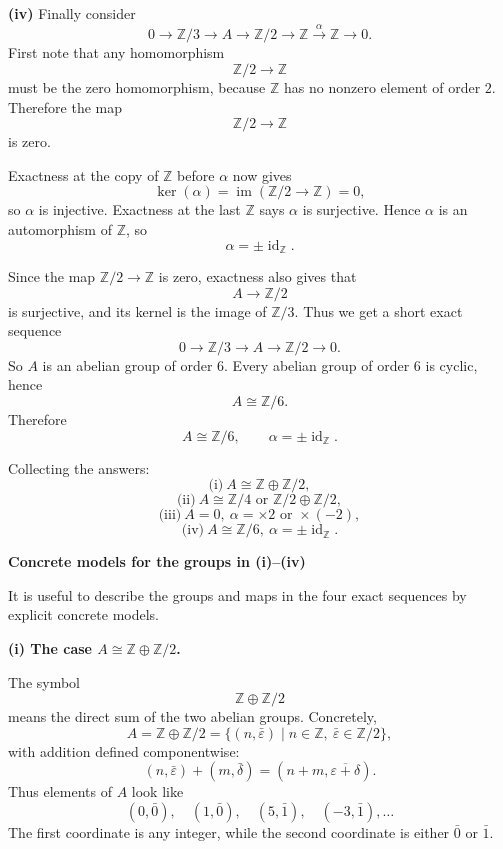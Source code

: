 \begin{solution}
\par

\textbf{(iv)} Finally consider
\[
0 \longrightarrow \mathbb Z/3 \longrightarrow A \longrightarrow \mathbb Z/2 \longrightarrow \mathbb Z \xrightarrow{\alpha} \mathbb Z \longrightarrow 0.
\]
First note that any homomorphism
\[
\mathbb Z/2 \longrightarrow \mathbb Z
\]
must be the zero homomorphism, because \(\mathbb Z\) has no nonzero element of order \(2\). Therefore the map
\[
\mathbb Z/2 \longrightarrow \mathbb Z
\]
is zero.

Exactness at the copy of \(\mathbb Z\) before \(\alpha\) now gives
\[
\ker(\alpha)=\operatorname{im}(\mathbb Z/2 \to \mathbb Z)=0,
\]
so \(\alpha\) is injective. Exactness at the last \(\mathbb Z\) says \(\alpha\) is surjective. Hence \(\alpha\) is an automorphism of \(\mathbb Z\), so
\[
\alpha=\pm \operatorname{id}_{\mathbb Z}.
\]

Since the map \(\mathbb Z/2 \to \mathbb Z\) is zero, exactness also gives that
\[
A \longrightarrow \mathbb Z/2
\]
is surjective, and its kernel is the image of \(\mathbb Z/3\). Thus we get a short exact sequence
\[
0 \longrightarrow \mathbb Z/3 \longrightarrow A \longrightarrow \mathbb Z/2 \longrightarrow 0.
\]
So \(A\) is an abelian group of order \(6\). Every abelian group of order \(6\) is cyclic, hence
\[
A \cong \mathbb Z/6.
\]
Therefore
\[
\boxed{A \cong \mathbb Z/6,\qquad \alpha=\pm \operatorname{id}_{\mathbb Z}.}
\]

\par

Collecting the answers:
\[
\boxed{\text{(i)}\ A\cong \mathbb Z\oplus \mathbb Z/2,}
\]
\[
\boxed{\text{(ii)}\ A\cong \mathbb Z/4 \text{ or } \mathbb Z/2\oplus \mathbb Z/2,}
\]
\[
\boxed{\text{(iii)}\ A=0,\ \alpha=\times 2 \text{ or } \times(-2),}
\]
\[
\boxed{\text{(iv)}\ A\cong \mathbb Z/6,\ \alpha=\pm \operatorname{id}_{\mathbb Z}.}
\]


\medskip
\noindent\textbf{Concrete models for the groups in (i)--(iv)}\par
\smallskip


It is useful to describe the groups and maps in the four exact sequences by explicit concrete models.

\par

\textbf{(i) The case \(A \cong \mathbb Z \oplus \mathbb Z/2\).}

The symbol
\[
\mathbb Z \oplus \mathbb Z/2
\]
means the direct sum of the two abelian groups. Concretely,
\[
A=\mathbb Z \oplus \mathbb Z/2
=\{(n,\bar\varepsilon)\mid n\in\mathbb Z,\ \bar\varepsilon\in\mathbb Z/2\},
\]
with addition defined componentwise:
\[
(n,\bar\varepsilon)+(m,\bar\delta)
=(n+m,\overline{\varepsilon+\delta}).
\]
Thus elements of \(A\) look like
\[
(0,\bar 0),\quad (1,\bar 0),\quad (5,\bar 1),\quad (-3,\bar 1),\dots
\]
The first coordinate is any integer, while the second coordinate is either \(\bar 0\) or \(\bar 1\).


\end{solution}
